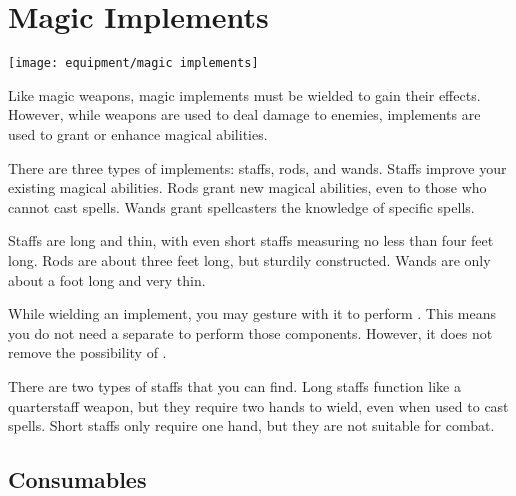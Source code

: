 \section{Magic Implements}\label{Implements}
    \texttt{[image: equipment/magic implements]}

    Like magic weapons, magic implements must be wielded to gain their effects.
    However, while weapons are used to deal damage to enemies, implements are used to grant or enhance magical abilities.

    There are three types of implements: staffs, rods, and wands.
    Staffs improve your existing magical abilities.
    Rods grant new magical abilities, even to those who cannot cast spells.
    Wands grant spellcasters the knowledge of specific spells.

    Staffs are long and thin, with even short staffs measuring no less than four feet long.
    Rods are about three feet long, but sturdily constructed.
    Wands are only about a foot long and very thin.

     While wielding an implement, you may gesture with it to perform .
    This means you do not need a separate  to perform those components.
    However, it does not remove the possibility of .

        There are two types of staffs that you can find.
        Long staffs function like a quarterstaff weapon, but they require two hands to wield, even when used to cast spells.
        Short staffs only require one hand, but they are not suitable for combat.

    \begin{longcolumn}
    
    \end{longcolumn}

    

\begin{longcolumn}
\section{Consumables}


\end{longcolumn}

